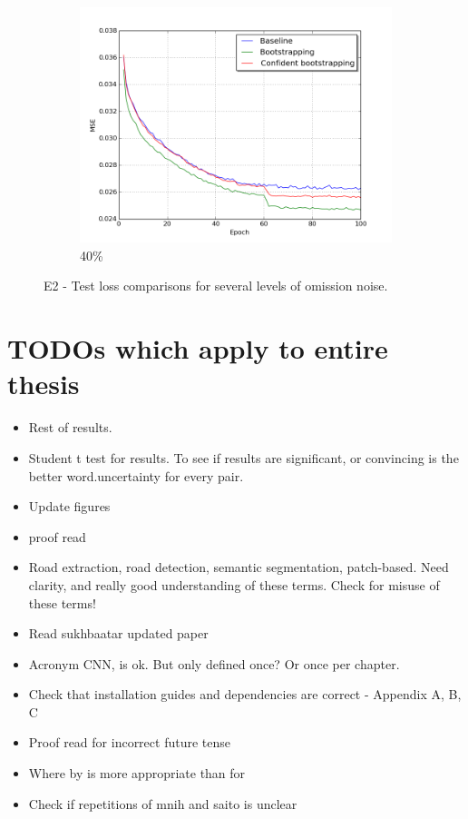 \begin{figure}[H]
\begin{subfigure}{0.31\textwidth}
\end{subfigure}
\hspace*{\fill} %
\begin{subfigure}{0.31\textwidth}
\includegraphics[width=\textwidth]{figs/E2/lc_4.png}
\caption{40\%} \label{fig:app_E2_4_lc}
\vspace{0.1cm} %
\end{subfigure}
\caption{E2 - Test loss comparisons for several levels of omission noise.} \label{fig:E2_all_lc}
\end{figure}


\section{TODOs which apply to entire thesis}
\begin{itemize}
\item Rest of results.
\item Student t test for results. To see if results are significant, or convincing is the better word.uncertainty for every pair.
\item Update figures
\item proof read
\item Road extraction, road detection, semantic segmentation, patch-based. Need clarity, and really good understanding of these terms. Check for misuse of these terms!
\item Read sukhbaatar updated paper
\item Acronym CNN, is ok. But only defined once? Or once per chapter.
\item Check that installation guides and dependencies are correct - Appendix A, B, C
\item Proof read for incorrect future tense
\item Where by is more appropriate than for
\item Check if repetitions of mnih and saito is unclear
\end{itemize}
